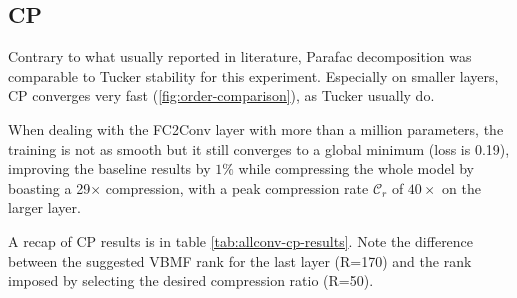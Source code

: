 \subsection{CP}
Contrary to what usually reported in literature\parencite{lebedev}, Parafac decomposition was comparable to Tucker stability for this experiment. Especially on smaller layers, CP converges very fast (\ref{fig:order-comparison}), as Tucker usually do. 
\newline 

When dealing with the FC2Conv layer with more than a million parameters, the training is not as smooth but it still converges to a global minimum (loss is 0.19), improving the baseline results by $1\%$ while compressing the whole model by boasting a 29$\times$ compression, with a peak compression rate $\mathcal{C}_r$ of $40\times$ on the larger layer.  

A recap of CP results is in table \ref{tab:allconv-cp-results}. Note the difference between the suggested VBMF rank for the last layer (R=170) and the rank imposed by selecting the desired compression ratio (R=50). 


